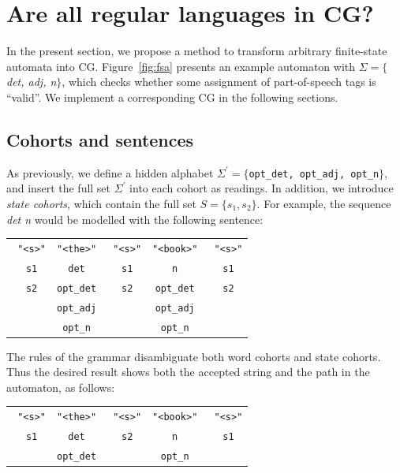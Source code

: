 \documentclass[11pt]{article}
\def\t#1{\texttt{#1}}
\def\h#1{{\tt \color{gray} #1}}
\def\swf{\h{"<s>"}}
\begin{document}
\section{Are all regular languages in CG?}\label{sec:regular}
In the present section, we propose a method to transform arbitrary finite-state
automata into CG. Figure~\ref{fig:fsa} presents an example automaton with
$\Sigma = \{$\emph{det, adj, n}$\}$, which checks whether some assignment of
part-of-speech tags is ``valid''. We implement a corresponding CG in the
following sections.

\subsection{Cohorts and sentences}
As previously, we define a hidden alphabet $\Sigma^{\prime} = \{$\t{opt\_det,
  opt\_adj, opt\_n}$\}$, and insert the full set $\Sigma^{\prime}$ into each
cohort as readings. In addition, we introduce \emph{state cohorts}, which
contain the full set $S = \{s_1, s_2\}$. For example, the sequence \emph{det n}
would be modelled with the following sentence:
%
\begin{center}
  \renewcommand{\tabcolsep}{2.5pt}
  \begin{tabular}{ccccc}
    \swf   & \t{"<the>"}  & \swf   & \t{"<book>"} & \swf   \\ 
    \h{s1} & \t{det}      & \h{s1} & \t{n}        & \h{s1} \\
    \h{s2} & \t{opt\_det} & \h{s2} & \t{opt\_det} & \h{s2} \\
           & \t{opt\_adj} &        & \t{opt\_adj} &        \\
           & \t{opt\_n}   &        & \t{opt\_n}   &        
  \end{tabular}
\end{center}
%
The rules of the grammar disambiguate both word cohorts and state cohorts. Thus
the desired result shows both the accepted string and the path in the automaton,
as follows:
%
\begin{center}
  \renewcommand{\tabcolsep}{2.5pt}
  \begin{tabular}{ccccc}
    \swf   & \t{"<the>"}  & \swf   & \t{"<book>"} & \swf   \\ 
    \h{s1} & \t{det}      & \h{s2} & \t{n}        & \h{s1} \\
           & \t{opt\_det} &        & \t{opt\_n}   &        
  \end{tabular}
\end{center}
\end{document}
